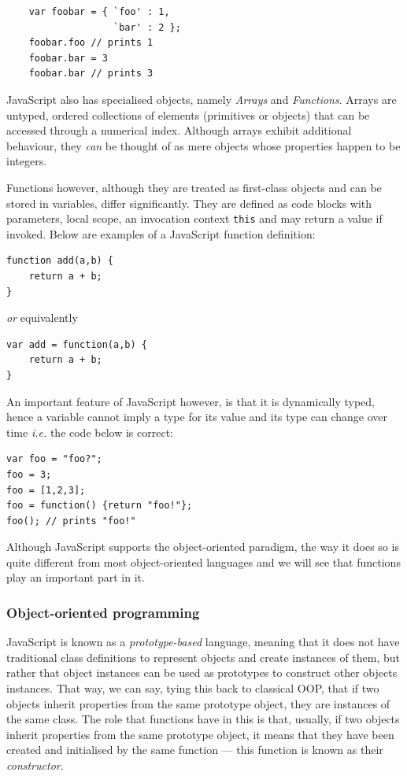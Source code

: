 \documentclass[a4paper,11pt,titlepage]{report}
\begin{document}
\begin{verbatim}
	var foobar = { `foo' : 1,
	               `bar' : 2 };
	foobar.foo // prints 1
	foobar.bar = 3
	foobar.bar // prints 3
\end{verbatim}

JavaScript also has specialised objects, namely \emph{Arrays} and \emph{Functions}. Arrays are untyped, ordered collections of elements (primitives or objects) that can be accessed through a numerical index. Although arrays exhibit additional behaviour, they \emph{can} be thought of as mere objects whose properties happen to be integers.

Functions however, although they are treated as first-class objects and can be stored in variables, differ significantly. They are defined as code blocks with parameters, local scope, an invocation context \texttt{this} and may return a value if invoked. Below are examples of a JavaScript function definition:

\begin{verbatim}
function add(a,b) {
    return a + b;
}
\end{verbatim}
\emph{or} equivalently
\begin{verbatim}
var add = function(a,b) {
    return a + b;
}
\end{verbatim}

An important feature of JavaScript however, is that it is dynamically typed, hence a variable cannot imply a type for its value and its type can change over time \emph{i.e.} the code below is correct:

\begin{verbatim}
var foo = "foo?";
foo = 3;
foo = [1,2,3];
foo = function() {return "foo!"};
foo(); // prints "foo!"
\end{verbatim}

Although JavaScript supports the object-oriented paradigm, the way it does so is quite different from most object-oriented languages and we will see that functions play an important part in it.

\subsubsection{Object-oriented programming}
\label{js}

JavaScript is known as a \emph{prototype-based} language, meaning that it does not have traditional class definitions to represent objects and create instances of them, but rather that object instances can be used as prototypes to construct other objects instances. That way, we can say, tying this back to classical OOP, that if two objects inherit properties from the same prototype object, they are instances of the same class. The role that functions have in this is that, usually, if two objects inherit properties from the same prototype object, it means that they have been created and initialised by the same function --- this function is known as their \emph{constructor}.
\end{document}
